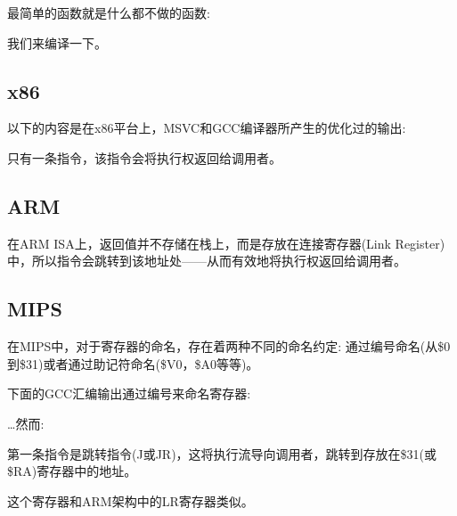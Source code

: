 \label{empty_func}

最简单的函数就是什么都不做的函数:



我们来编译一下。

\subsection{x86}

以下的内容是在x86平台上，MSVC和GCC编译器所产生的优化过的输出:



只有一条指令\RET，该指令会将执行权返回给\gls{调用者}。

\subsection{ARM}



在ARM \ac{ISA}上，返回值并不存储在栈上，而是存放在连接寄存器(Link Register)中，所以指令会跳转到该地址处——从而有效地将执行权返回给\gls{调用者}。

\subsection{MIPS}

在MIPS中，对于寄存器的命名，存在着两种不同的命名约定: 通过编号命名(从\$0到\$31)或者通过助记符命名(\$V0，\$A0等等)。

下面的GCC汇编输出通过编号来命名寄存器:



\dots 然而:



第一条指令是跳转指令(J或JR)，这将执行流导向\gls{调用者}，跳转到存放在\$31(或\$RA)寄存器中的地址。

这个寄存器和ARM架构中的\ac{LR}寄存器类似。


